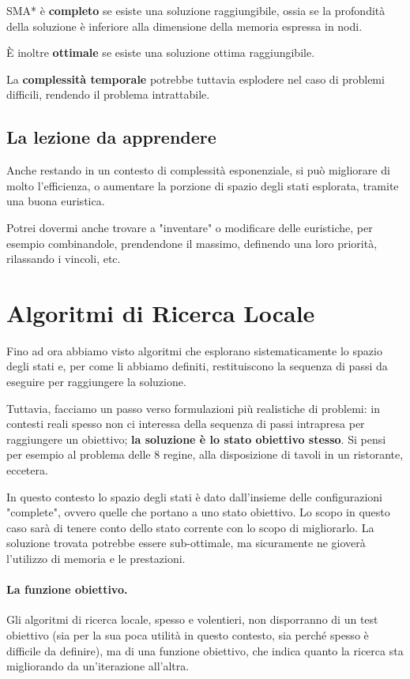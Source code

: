         SMA* è \textbf{completo} se esiste una soluzione raggiungibile, ossia se la profondità della soluzione è inferiore alla dimensione della memoria espressa in nodi.
        
        È inoltre \textbf{ottimale} se esiste una soluzione ottima raggiungibile.
        
        La \textbf{complessità temporale} potrebbe tuttavia esplodere nel caso di problemi difficili, rendendo il problema intrattabile.
        
    \subsection{La lezione da apprendere}
        Anche restando in un contesto di complessità esponenziale, si può migliorare di molto l'efficienza, o aumentare la porzione di spazio degli stati esplorata, tramite una buona euristica.
        
        Potrei dovermi anche trovare a "inventare" o modificare delle euristiche, per esempio combinandole, prendendone il massimo, definendo una loro priorità, rilassando i vincoli, etc.

\newpage
\section{Algoritmi di Ricerca Locale}
    Fino ad ora abbiamo visto algoritmi che esplorano sistematicamente lo spazio degli stati e, per come li abbiamo definiti, restituiscono la sequenza di passi da eseguire per raggiungere la soluzione.
    
    Tuttavia, facciamo un passo verso formulazioni più realistiche di problemi: in contesti reali spesso non ci interessa della sequenza di passi intrapresa per raggiungere un obiettivo; \textbf{la soluzione è lo stato obiettivo stesso}. Si pensi per esempio al problema delle 8 regine, alla disposizione di tavoli in un ristorante, eccetera.
    
    In questo contesto lo spazio degli stati è dato dall'insieme delle configurazioni "complete", ovvero quelle che portano a uno stato obiettivo. Lo scopo in questo caso sarà di tenere conto dello stato corrente con lo scopo di migliorarlo. La soluzione trovata potrebbe essere sub-ottimale, ma sicuramente ne gioverà l'utilizzo di memoria e le prestazioni.
    
    \paragraph{La funzione obiettivo.}
        Gli algoritmi di ricerca locale, spesso e volentieri, non disporranno di un test obiettivo (sia per la sua poca utilità in questo contesto, sia perché spesso è difficile da definire), ma di una funzione obiettivo, che indica quanto la ricerca sta migliorando da un'iterazione all'altra.
        
